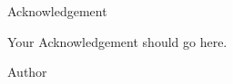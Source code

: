 
\clearpage
\thispagestyle{empty}
\begin{center}
    \fontsize{12}{20} \selectfont Acknowledgement
\end{center}
\par

Your Acknowledgement should go here. 

\bigskip
\noindent
Author

\noindent
\Author

